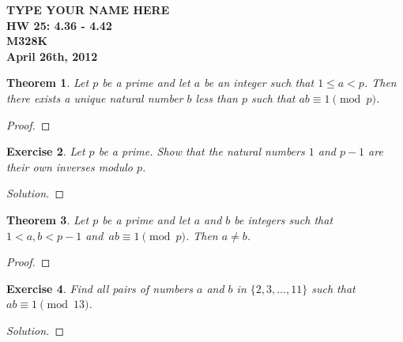 \documentclass[12pt,leqno]{article}
\numberwithin{equation}{section}
\newtheorem{thm}{Theorem}[section]
\newtheorem{exer}[thm]{Exercise}
\theoremstyle{definition}
\begin{document}
\thispagestyle{plain}
\begin{flushright}
\large{\textbf{TYPE YOUR NAME HERE \\
HW 25: 4.36 - 4.42\\
M328K \\
April 26th, 2012 \\}}
\end{flushright}

\markboth{}{} \setcounter{section}{0} \baselineskip=18pt

\setcounter{tocdepth}{4}



\setcounter{section}{4}

\setcounter{thm}{35}

\begin{thm}
Let $p$ be a prime and let $a$ be an integer such that $1 \leq a <
p$.  Then there exists a unique natural number $b$ less than $p$
such that $ab \equiv 1 \pmod{p}$.
\end{thm}
\begin{proof}[Proof]
\end{proof}

\begin{exer}
Let $p$ be a prime. Show that the natural numbers $1$ and $p-1$ are
their own inverses modulo $p$.
\end{exer}
\begin{proof}[Solution]
\end{proof}

\begin{thm}
Let $p$ be a prime and let $a$ and $b$ be integers such that $1 <
a,b < p-1$ and~\mbox{$ab \equiv 1 \pmod{p}$}. Then $a \neq b$.
\end{thm}
\begin{proof}[Proof]
\end{proof}

\begin{exer}
 Find all pairs of numbers $a$ and $b$ in
$\{2, 3, \dots, 11\}$ such that $ab \equiv 1 \pmod{13}$.
\end{exer}
\begin{proof}[Solution]
\end{proof}
\end{document}

